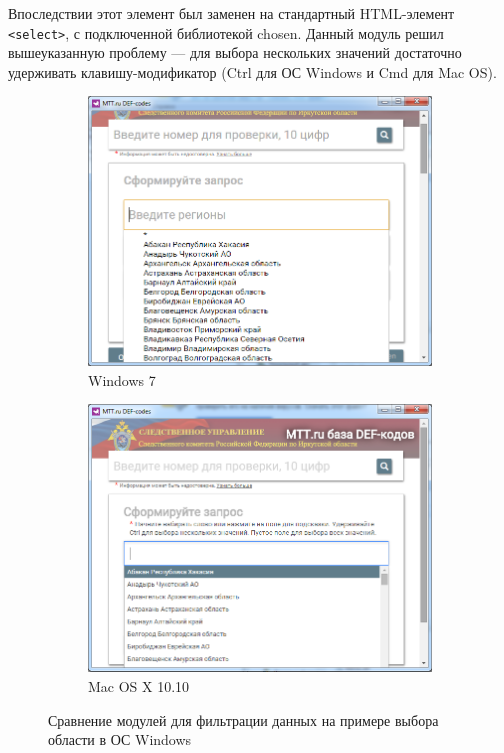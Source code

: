 Впоследствии этот элемент был заменен на стандартный HTML-элемент \texttt{<select>}, с подключенной библиотекой chosen\cite{chosen}. Данный модуль решил вышеуказанную проблему --- для выбора нескольких значений достаточно удерживать клавишу-модификатор (Ctrl для ОС Windows и Cmd для Mac OS).

\begin{figure}[H]
	\centering
	\begin{subfigure}[r]{0.45\textwidth}
		\includegraphics[width=\textwidth]{pics/screens/win_autocomp.png}
		\caption{Windows 7}
	\end{subfigure}
	\quad
	\begin{subfigure}[l]{0.45\textwidth}
		\includegraphics[width=\textwidth]{pics/screens/win_chosen.png}
		\caption{Mac OS X 10.10}
	\end{subfigure}
	\caption{Сравнение модулей для фильтрации данных на примере выбора области в ОС Windows}
\end{figure}

